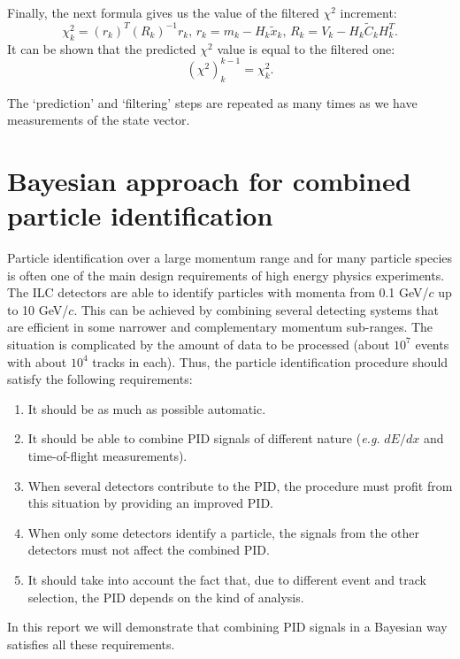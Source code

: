 \documentclass[12pt,a4paper,twoside]{article}
\begin{document}
{Finally, the next formula gives us the value of the filtered $\chi^2$ increment:
\[
\chi^2_k = (r_k)^T(R_k)^{-1}r_k\mbox{,\ \ \ \ }
r_k = m_k - H_k\tilde{x}_k\mbox{,\ \ \ \ }
R_k = V_k - H_k\tilde{C}_kH_k^T .
\]
It can be shown that the predicted $\chi^2$ value is equal to the filtered
one:
\begin{equation}
  (\chi^2)_k^{k-1} = \chi^2_k \label{chi=chi} .
\end{equation}

The `prediction' and `filtering' steps are repeated as many times as we have
measurements of the state vector. 

\section {Bayesian approach for combined particle identification}\label{BayesianPID}

Particle identification over a large momentum range and
for many particle species is often one of the main design
requirements of high energy physics experiments. 
The ILC detectors are able to   
identify particles with momenta from 0.1 GeV/$c$ up to
10 GeV/$c$. This can be achieved by combining
several detecting systems that are efficient in some narrower and 
complementary momentum sub-ranges. The situation is complicated by 
the amount of data to be processed (about $10^7$ events with 
about $10^4$ tracks in each). Thus, the particle identification 
procedure should satisfy the following 
requirements:
\begin{enumerate}
\item It should be as much as possible automatic. 
\item It should be able to combine PID signals of different nature 
({\it e.g.} $dE/dx$ and time-of-flight measurements).
\item When several detectors contribute to the PID, the procedure must profit
 from this situation by providing an improved PID.
\item When only some detectors identify a particle, the signals from the other
 detectors must not affect the combined PID.
\item It should take into account the fact that, due to 
different event and track selection, the PID depends on the kind of analysis.
\end{enumerate}

In this report we will demonstrate that combining PID signals in a Bayesian way
satisfies all these requirements.

}
\end{document}

